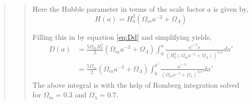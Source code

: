 \begin{quote}
\begin{quote}
Here the Hubble parameter in terms of the scale factor $a$ is given by,
\begin{equation}
H(a) = H_0^2 ( \Omega_m a^{-3} + \Omega_{\Lambda} )
\end{equation}

Filling this in by equation \ref{eq:Dd} and simplifying yields,
\begin{align}
D(a) &= \frac{5 \Omega_m H_0^3}{2} ( \Omega_m a^{-3} + \Omega_{\Lambda} ) \int_0^{a} \frac{a'^{-3}s}{\left(H_0^2( \Omega_m a^{-3} + \Omega_{\Lambda} ) \right)^{3/2}} da' \\
&= \frac{5 \Omega_m}{2}  ( \Omega_m a^{-3} + \Omega_{\Lambda} ) \int_0^{a'} \frac{a'^{-3}}{\left(\Omega_m a^{-3} + \Omega_{\lambda}\right)^{3/2}} da'
\end{align}
\newpage
The above integral is with the help of Romberg integration solved for $\Omega_{m} =0.3$ and $\Omega_{\lambda} = 0.7$.  
\end{quote}
\end{quote}





